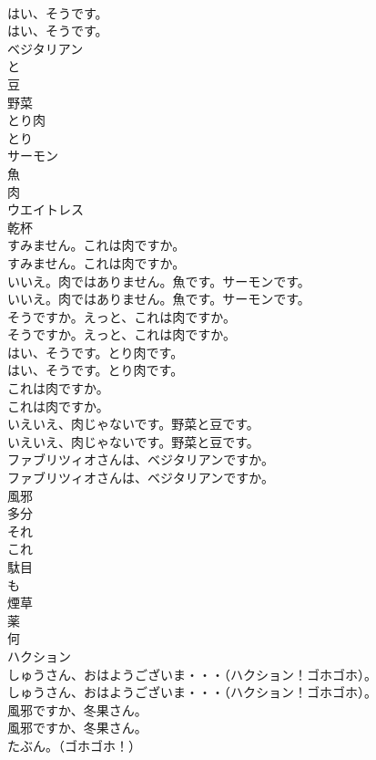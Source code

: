 \documentclass[8pt]{extreport}
\begin{document}
\begin{CJK}{UTF8}{min}
\\	はい、そうです。	
\\	はい、そうです。 
\\	ベジタリアン
\\	と
\\	豆
\\	野菜
\\	とり肉
\\	とり
\\	サーモン
\\	魚
\\	肉
\\	ウエイトレス
\\	乾杯
\\	すみません。これは肉ですか。	
\\	すみません。これは肉ですか。 
\\	いいえ。肉ではありません。魚です。サーモンです。	
\\	いいえ。肉ではありません。魚です。サーモンです。 
\\	そうですか。えっと、これは肉ですか。	
\\	そうですか。えっと、これは肉ですか。 
\\	はい、そうです。とり肉です。	
\\	はい、そうです。とり肉です。 
\\	これは肉ですか。	
\\	これは肉ですか。 
\\	いえいえ、肉じゃないです。野菜と豆です。	
\\	いえいえ、肉じゃないです。野菜と豆です。 
\\	ファブリツィオさんは、ベジタリアンですか。	
\\	ファブリツィオさんは、ベジタリアンですか。 
\\	風邪
\\	多分
\\	それ
\\	これ
\\	駄目
\\	も
\\	煙草
\\	薬
\\	何
\\	ハクション
\\	しゅうさん、おはようございま・・・（ハクション！ゴホゴホ）。	
\\	しゅうさん、おはようございま・・・（ハクション！ゴホゴホ）。 
\\	風邪ですか、冬果さん。	
\\	風邪ですか、冬果さん。 
\\	たぶん。（ゴホゴホ！）	

\end{CJK}
\end{document}
